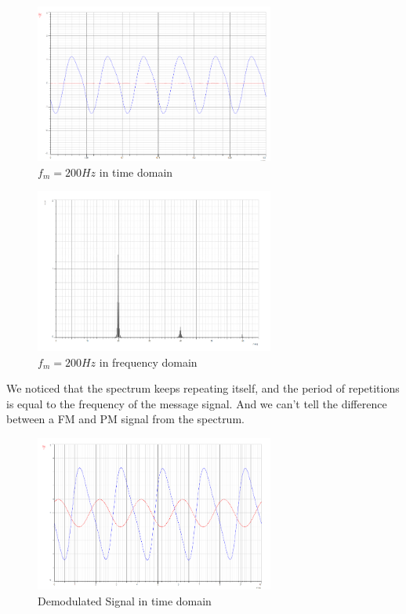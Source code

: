 \documentclass[12pt]{article}
\begin{document}
\begin{figure}[H]
    \centering
    \includegraphics[width=0.7\textwidth]{assets/p2.png}
    \caption{$f_m = 200Hz$ in time domain}
\end{figure}
\begin{figure}[H]
    \centering
    \includegraphics[width=0.7\textwidth]{assets/p4.png}
    \caption{$f_m = 200Hz$ in frequency domain}
\end{figure}
We noticed that the spectrum keeps repeating itself, and the period of repetitions is equal to the frequency of the message signal. And we can't tell the difference between a FM and PM signal from the spectrum.
\begin{figure}[H]
    \centering
    \includegraphics[width=0.7\textwidth]{assets/p5.png}
    \caption{Demodulated Signal in time domain}
\end{figure}
\end{document}
